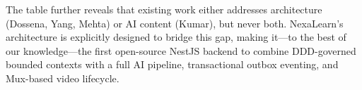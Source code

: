 The table further reveals that existing work either addresses architecture (Dossena, Yang, Mehta) or AI content (Kumar), but never both. NexaLearn's architecture is explicitly designed to bridge this gap, making it---to the best of our knowledge---the first open-source NestJS backend to combine DDD-governed bounded contexts with a full AI pipeline, transactional outbox eventing, and Mux-based video lifecycle.
